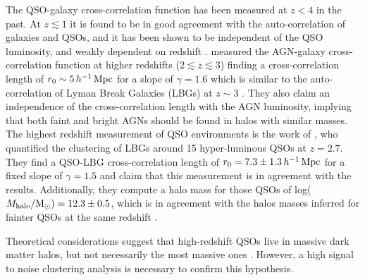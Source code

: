 \documentclass[iop, revtex4]{emulateapj}
\begin{document}
The QSO-galaxy cross-correlation function has been measured at $z<4$
in the past. At $z\lesssim1$ it is found to be in good agreement with
the auto-correlation of galaxies and QSOs, and it has been shown to be
independent of the
QSO luminosity, and weakly dependent on redshift
\citep[e.g.][]{Padmanabhan09, Coil07}.
\citet{Adelberger05} measured
the AGN-galaxy cross-correlation function at higher redshifts
($2\lesssim z \lesssim3$) finding a cross-correlation length of
$r_{0}\sim 5\,h^{-1}\,{\rm Mpc}$ for a slope of $\gamma=1.6$ which is
similar to the auto-correlation of Lyman Break Galaxies (LBGs) at $z\sim3$
\citep{Adelberger03}. They also claim an independence of the
cross-correlation length with the AGN luminosity, implying that both
faint and bright AGNs should be found in halos with similar
masses.
The highest redshift measurement of QSO environments
is the work of \citet{Trainor12}, who quantified the clustering of LBGs
around 15 hyper-luminous QSOs at $z=2.7$. They find a QSO-LBG
cross-correlation length of $r_{0}= 7.3\pm1.3 \,h^{-1}\,{\rm Mpc}$ for
a fixed slope of $\gamma=1.5$ and claim that this measurement is in
agreement with the \citet{Adelberger05} results. Additionally, they
compute a halo mass for those QSOs of log($M_{\rm halo}/\rm
M_{\odot})=12.3 \pm0.5$, which is in agreement with the halos masses
inferred for
fainter QSOs at the same redshift \citep{White12}.

Theoretical considerations suggest that high-redshift QSOs live in
massive dark matter halos, but not necessarily the most massive ones
\citep{Fanidakis13}. 
However, a high
signal to noise clustering analysis is necessary to confirm this
hypothesis.
\end{document}
